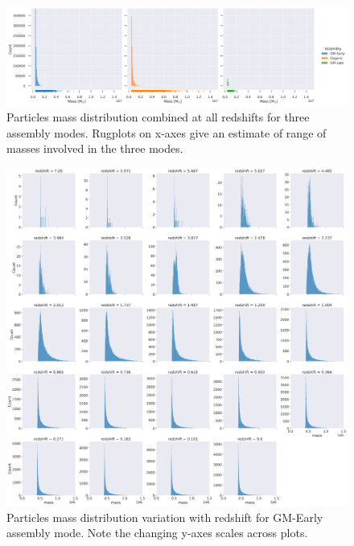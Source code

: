 \documentclass{article}
\begin{document}
	\begin{figure}
			\centering 
			\includegraphics[width=\columnwidth]{../plots/particle_mass_distribution.png}
			\caption{Particles mass distribution combined at all redshifts for three assembly modes. Rugplots on x-axes give an estimate of range of masses involved in the three modes.}
	\end{figure}

	\clearpage

	\begin{figure}
			\centering 
			\includegraphics[width=.9\columnwidth]{../plots/mass_distribution_wrt_redshift_GM-Early.png}
			\caption{Particles mass distribution variation with redshift for GM-Early assembly mode. Note the changing y-axes scales across plots.}
	\end{figure}

	\clearpage
\end{document}

